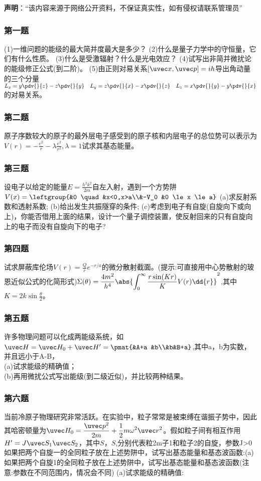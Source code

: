 


\textbf{声明}：“该内容来源于网络公开资料，不保证真实性，如有侵权请联系管理员”

\subsubsection{第一题}
(1)一维问题的能级的最大简并度最大是多少？
(2)什么是量子力学中的守恒量，它们有什么性质。
(3)什么是受激辐射？什么是光电效应？
(4)试写出非简并微扰论的能级修正公式(到二阶)。
(5)由正则对易关系$[\uvec x,\uvec p]=ih$导出角动量的三个分量$\displaystyle L_x=y\pdv{}{z}-z\pdv{}{y}  \quad L_y=z\pdv{}{x}-x\pdv{}{z} \quad L_z=x\pdv{}{y}-y\pdv{}{x}$
的对易关系。
\subsubsection{第二题}
原子序数较大的原子的最外层电子感受到的原子核和内层电子的总位势可以表示为$\displaystyle V(r)=-\frac{e^2}{r}-\lambda\frac{e^2}{r^2},\lambda=1$试求其基态能量。
\subsubsection{第三题}
设电子以给定的能量$E=\frac{h^2k^2}{2m}$自左入射，遇到一个方势阱$V(x)=\leftgroup{&0 \quad &x<0,x>a\\&-V_0 &0 \le x \le a}$
(a)求反射系数和透射系数;
(b)给出发生共振隧穿的条件;
(c)考虑到电子有自旋(自旋向下或向上)，你能否借用上面的结果，设计一个量子调控装置，使反射回来的只有自旋向上的电子而没有自旋向下的电子?
\subsubsection{第四题}
试求屏蔽库伦场$V(r)=\frac{Q}{r}e^{-r/a} $的微分散射截面。(提示:可直接用中心势散射的玻恩近似公式的化简形式)$\displaystyle \Sigma(\theta)=\frac{4m^2}{h^4}\abs{\int_{0}^{\infty}\frac{r\sin(Kr)}{K}V(r)\dd{r}}^2$,其中$\displaystyle K=2k\sin \frac{\theta}{2}$。
\subsubsection{第五题}
许多物理问题可以化成两能级系统，如$\uvec H=\uvec H_0+\uvec H'=\pmat{&A+a &b\\&b&B+a}$,其中a，b为实数，并且远小于A-B，\\
(a)试求能级的精确值；\\
(b)再用微扰公式写出能级(到二级近似)，并比较两种结果。
\subsubsection{第六题}
当前冷原子物理研究非常活跃。在实验中，粒子常常是被束缚在谐振子势中，因此其哈密顿量为$\displaystyle \uvec H_0=\frac{\uvec p^2}{2m}+\frac{1}{2}m\omega^2 \uvec r^2$。假如粒子间有相互作用$H'=J\uvec S_1 \uvec S_2$，其中$S，S$,分别代表粒2m子1和粒子2的自旋，参数J>0
如果把两个自旋一的全同粒子放在上述势阱中，试写出基态能量和基态波函数:(a)如果把两个自旋1的全同粒子放在上述势阱中，试写出基态能量和基态波函数(注意:参数在不同范围内，情况会不同)
(a)试求能级的精确值: